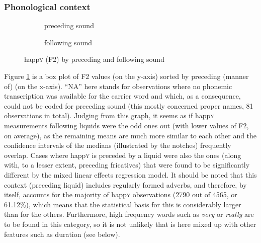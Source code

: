 \subsubsection{Phonological context}
\label{sec.prod.res.vow.happy.f2.phon}

\begin{figure}[h!]
	\centering
	\begin{subfigure}{.49\textwidth}
		\centering
			\resizebox{\linewidth}{!}{} 
		\caption{preceding sound}
		\label{fig.box.f2w.happy.presound}
	\end{subfigure}
	\begin{subfigure}{.49\textwidth}
		\centering
			\resizebox{\linewidth}{!}{} 
		\caption{following sound}
		\label{fig.box.f2w.happy.follsound}
	\end{subfigure}
	\caption{happ\textsc{y} (F2) by preceding and following sound}
\end{figure}

Figure \ref{fig.box.f2w.happy.presound} is a box plot of F2 values (on the y-axis) sorted by preceding (manner of)  (on the x-axis).
``NA'' here stands for observations where no phonemic transcription was available for the carrier word and which, as a consequence, could not be coded for preceding sound (this mostly concerned proper names, 81 observations in total).
Judging from this graph, it seems as if happ\textsc{y} measurements following liquids were the odd ones out (with lower values of F2, on average), as the remaining means are much more similar to each other and the confidence intervals of the medians (illustrated by the notches) frequently overlap.
Cases where happ\textsc{y} is preceded by a liquid were also the ones (along with, to a lesser extent, preceding fricatives) that were found to be significantly different by the mixed linear effects regression model.
It should be noted that this context (preceding liquid) includes regularly formed adverbs, and therefore, by itself, accounts for the majority of happ\textsc{y} observations (2790 out of 4565, or 61.12\%), which means that the statistical basis for this  is considerably larger than for the others.
Furthermore, high frequency words such as \emph{very} or \emph{really} are to be found in this category, so it is not unlikely that  is here mixed up with other features such as duration (see below).

